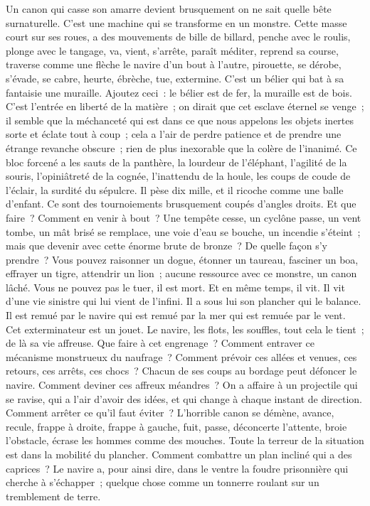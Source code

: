 \documentclass[french,twoside]{book} %
\begin{document}
Un canon qui casse son amarre devient brusquement on ne sait quelle bête surnaturelle. C’est une machine qui se transforme en un monstre. Cette masse court sur ses roues, a des mouvements de bille de billard, penche avec le roulis, plonge avec le tangage, va, vient, s’arrête, paraît méditer, reprend sa course, traverse comme une flèche le navire d’un bout à l’autre, pirouette, se dérobe, s’évade, se cabre, heurte, ébrèche, tue, extermine. C’est un bélier qui bat à sa fantaisie une muraille. Ajoutez ceci : le bélier est de fer, la muraille est de bois. C’est l’entrée en liberté de la matière ; on dirait que cet esclave éternel se venge ; il semble que la méchanceté qui est dans ce que nous appelons les objets inertes sorte et éclate tout à coup ; cela a l’air de perdre patience  et de prendre une étrange revanche obscure ; rien de plus inexorable que la colère de l’inanimé. Ce bloc forcené a les sauts de la panthère, la lourdeur de l’éléphant, l’agilité de la souris, l’opiniâtreté de la cognée, l’inattendu de la houle, les coups de coude de l’éclair, la surdité du sépulcre. Il pèse dix mille, et il ricoche comme une balle d’enfant. Ce sont des tournoiements brusquement coupés d’angles droits. Et que faire ? Comment en venir à bout ? Une tempête cesse, un cyclône passe, un vent tombe, un mât brisé se remplace, une voie d’eau se bouche, un incendie s’éteint ; mais que devenir avec cette énorme brute de bronze ? De quelle façon s’y prendre ? Vous pouvez raisonner un dogue, étonner un taureau, fasciner un boa, effrayer un tigre, attendrir un lion ; aucune ressource avec ce monstre, un canon lâché. Vous ne pouvez pas le tuer, il est mort. Et en même temps, il vit. Il vit d’une vie sinistre qui lui vient de l’infini. Il a sous lui son plancher qui le balance. Il est remué par le navire qui est remué par la mer qui est remuée par le vent. Cet exterminateur est un jouet. Le navire, les flots, les souffles, tout cela le tient ; de là sa vie affreuse. Que faire à cet engrenage ? Comment entraver ce mécanisme monstrueux du naufrage ? Comment prévoir ces allées et venues, ces retours, ces arrêts, ces chocs ? Chacun de ses coups au bordage peut défoncer le navire. Comment deviner ces affreux méandres ? On a affaire à un projectile qui se ravise, qui a l’air d’avoir des idées, et qui change à chaque instant de direction. Comment arrêter  ce qu’il faut éviter ? L’horrible canon se démène, avance, recule, frappe à droite, frappe à gauche, fuit, passe, déconcerte l’attente, broie l’obstacle, écrase les hommes comme des mouches. Toute la terreur de la situation est dans la mobilité du plancher. Comment combattre un plan incliné qui a des caprices ? Le navire a, pour ainsi dire, dans le ventre la foudre prisonnière qui cherche à s’échapper ; quelque chose comme un tonnerre roulant sur un tremblement de terre.\par
\end{document}
